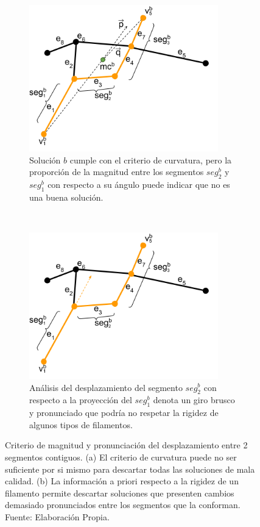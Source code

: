 \begin{figure}[h]
    \centering
    \begin{subfigure}[t]{0.45\textwidth}
        \centering
        \includegraphics[height=2.5in]{imagenes/ant_segmentMagnitude_case.png}
        \caption{Soluci\'on $b$ cumple con el criterio de curvatura, pero la proporci\'on de la magnitud entre los segmentos $seg^{b}_2$ y $seg^{b}_1$ con respecto a su \'angulo puede indicar que no es una buena soluci\'on.}
        \label{fig:antCurvNotEnough}
    \end{subfigure}
    ~ \hspace{0.5cm}
    \begin{subfigure}[t]{0.45\textwidth}
        \centering
        \includegraphics[height=2.5in]{imagenes/ant_segmentMagnitude_case_2.png}
        \caption{An\'alisis del desplazamiento del segmento $seg^{b}_2$ con respecto a la proyecci\'on del $seg^{b}_1$ denota un giro brusco y pronunciado que podr\'ia no respetar la rigidez de algunos tipos de filamentos.}
        \label{fig:antMaxDisplExample}
    \end{subfigure}%
    \caption[Criterio de magnitud y pronunciaci\'on del desplazamiento entre 2 segmentos contiguos.]{Criterio de magnitud y pronunciaci\'on del desplazamiento entre 2 segmentos contiguos. (a) El criterio de curvatura puede no ser suficiente por si mismo para descartar todas las soluciones de mala calidad. (b) La informaci\'on a priori respecto a la rigidez de un filamento permite descartar soluciones que presenten cambios demasiado pronunciados entre los segmentos que la conforman. Fuente: Elaboraci\'on Propia.}
    \label{fig:antMaxDisp}
\end{figure}

